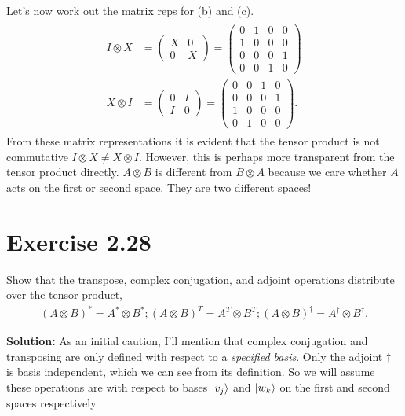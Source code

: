 \documentclass{book}
\begin{document}
    Let's now work out the matrix reps for (b) and (c).
    \begin{align}
    \begin{aligned}
        I\otimes X &= \begin{pmatrix}
            X & 0 \\
            0 & X
        \end{pmatrix} = \begin{pmatrix}
            0 & 1 & 0 & 0 \\
            1 & 0 & 0 & 0 \\
            0 & 0 & 0 & 1 \\
            0 & 0 & 1 & 0
        \end{pmatrix} \\
        X \otimes I &= \begin{pmatrix}
            0 & I \\
            I & 0
        \end{pmatrix} = \begin{pmatrix}
            0 & 0 & 1 & 0 \\
            0 & 0 & 0 & 1 \\
            1 & 0 & 0 & 0 \\
            0 & 1 & 0 & 0
        \end{pmatrix}.
    \end{aligned}
    \end{align}
    From these matrix representations it is evident that the tensor product is not commutative $I \otimes X \neq X \otimes I$. However, this is perhaps more transparent from the tensor product directly. $A\otimes B$ is different from $B \otimes A$ because we care whether $A$ acts on the first or second space. They are two different spaces!
    
\section{Exercise 2.28}
    Show that the transpose, complex conjugation, and adjoint operations distribute over the tensor product,
    \begin{align}
        (A\otimes B)^* = A^* \otimes B^*; (A\otimes B)^T = A^T \otimes B^T; (A\otimes B)^\dagger = A^\dagger \otimes B^\dagger.
    \end{align}
    
    \textbf{Solution:} As an initial caution, I'll mention that complex conjugation and transposing are only defined with respect to a \emph{specified basis}. Only the adjoint $\dagger$ is basis independent, which we can see from its definition. So we will assume these operations are with respect to bases $\ket{v_j}$ and $\ket{w_k}$ on the first and second spaces respectively. 
    
\end{document}
